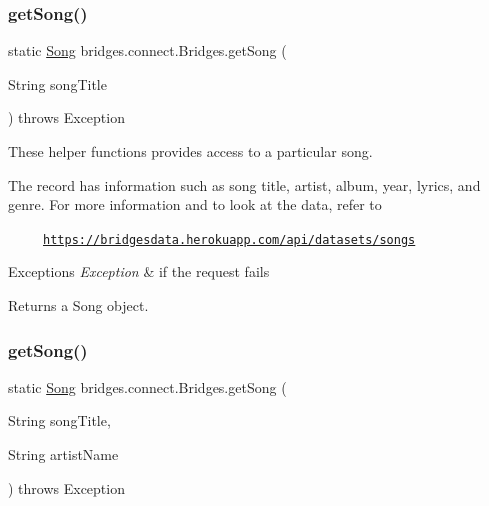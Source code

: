 \mbox{\label{classbridges_1_1connect_1_1_bridges_a7f65e6648f9e66a02343a39f2fc425cb}} 
\subsubsection{\texorpdfstring{get\+Song()}{getSong()}\hspace{0.1cm}{\footnotesize\ttfamily [1/2]}}
{\footnotesize\ttfamily static \mbox{\hyperlink{classbridges_1_1data__src__dependent_1_1_song}{Song}} bridges.\+connect.\+Bridges.\+get\+Song (\begin{DoxyParamCaption}\item[{String}]{song\+Title }\end{DoxyParamCaption}) throws Exception\hspace{0.3cm}{\ttfamily [static]}}

These helper functions provides access to a particular song.

The record has information such as song title, artist, album, year, lyrics, and genre. For more information and to look at the data, refer to 

~~~~~\href{https://bridgesdata.herokuapp.com/api/datasets/songs}{\tt https\+://bridgesdata.\+herokuapp.\+com/api/datasets/songs} 


\begin{DoxyExceptions}{Exceptions}
{\em Exception} & if the request fails\\
\hline
\end{DoxyExceptions}
\begin{DoxyReturn}{Returns}
a Song object. 
\end{DoxyReturn}
\mbox{\label{classbridges_1_1connect_1_1_bridges_ae7621c3cfd9978aa02fe243317cf0cca}} 
\subsubsection{\texorpdfstring{get\+Song()}{getSong()}\hspace{0.1cm}{\footnotesize\ttfamily [2/2]}}
{\footnotesize\ttfamily static \mbox{\hyperlink{classbridges_1_1data__src__dependent_1_1_song}{Song}} bridges.\+connect.\+Bridges.\+get\+Song (\begin{DoxyParamCaption}\item[{String}]{song\+Title,  }\item[{String}]{artist\+Name }\end{DoxyParamCaption}) throws Exception\hspace{0.3cm}{\ttfamily [static]}}

